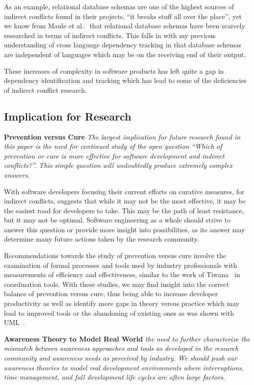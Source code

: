As an example, relational database schemas are one of the highest sources of indirect
conflicts found in their projects, ``it breaks stuff all over the place'',
yet we know from Maule et al.~\cite{Maule:2008:IAD} that relational database schemas have 
been scarcely researched in terms of indirect conflicts. This falls in with my previous understanding of cross language
dependency tracking in that database schemas are independent of languages which may be on the receiving end of their output.

These increases of complexity in software products has left quite a gap in dependency identification and tracking which 
has lead to some of the deficiencies of indirect conflict research.


\subsection{Implication for Research}
\label{sec:implr}

\textbf{Prevention versus Cure} \textit{The largest implication for future research found in this paper is the need for continued study of the open question
``Which of prevention or cure is more effective for software development and indirect conflicts?''. This simple question will undoubtedly 
produce extremely complex answers.}

With software developers focusing their current efforts on curative measures, for
indirect conflicts, suggests
that while it may not be the most effective, it may be the easiest road for developers to take. This may be the path of
least resistance, but it may not be optimal. Software engineering as a whole should strive to answer this question or
provide more insight into possibilities, as its answer may determine many future actions taken by the research community.

Recommendations towards the study of prevention versus cure involve the examination of formal processes and tools used
by industry professionals with measurements of efficiency and effectiveness, similar to the work of
Tiwana~\cite{Tiwana:2008:ICD} in coordination tools. With these studies, we may find insight into the correct balance
of prevention versus cure, thus being able to increase developer productivity as well as identify more gaps in theory 
versus practice which may lead to improved tools or the abandoning of existing ones as was shown with UML~\cite{Petre:2013:UP}.

\textbf{Awareness Theory to Model Real World} \textit{the need to further characterize the
mismatch between awareness approaches and tools as developed in the research community and awareness needs as perceived
by industry. We should push our awareness theories to model real development
environments where interruptions, time management, and full development life cycles are often large factors.}

